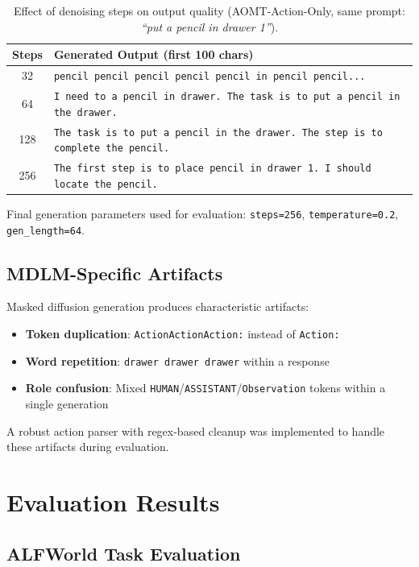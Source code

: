 \documentclass[11pt,a4paper]{article}
\begin{document}
\begin{table}[h]
\centering
\caption{Effect of denoising steps on output quality (AOMT-Action-Only, same prompt: \textit{``put a pencil in drawer 1''}).}
\label{tab:steps}
\begin{tabular}{cl}
\toprule
\textbf{Steps} & \textbf{Generated Output (first 100 chars)} \\
\midrule
32 & \texttt{pencil pencil pencil pencil pencil in pencil pencil...} \\
64 & \texttt{I need to a pencil in drawer. The task is to put a pencil in the drawer.} \\
128 & \texttt{The task is to put a pencil in the drawer. The step is to complete the pencil.} \\
256 & \texttt{The first step is to place pencil in drawer 1. I should locate the pencil.} \\
\bottomrule
\end{tabular}
\end{table}

Final generation parameters used for evaluation: \texttt{steps=256}, \texttt{temperature=0.2}, \texttt{gen\_length=64}.

\subsection{MDLM-Specific Artifacts}
Masked diffusion generation produces characteristic artifacts:
\begin{itemize}[nosep]
  \item \textbf{Token duplication}: \texttt{ActionActionAction:} instead of \texttt{Action:}
  \item \textbf{Word repetition}: \texttt{drawer drawer drawer} within a response
  \item \textbf{Role confusion}: Mixed \texttt{HUMAN}/\texttt{ASSISTANT}/\texttt{Observation} tokens within a single generation
\end{itemize}
A robust action parser with regex-based cleanup was implemented to handle these artifacts during evaluation.

\section{Evaluation Results}

\subsection{ALFWorld Task Evaluation}
\end{document}
